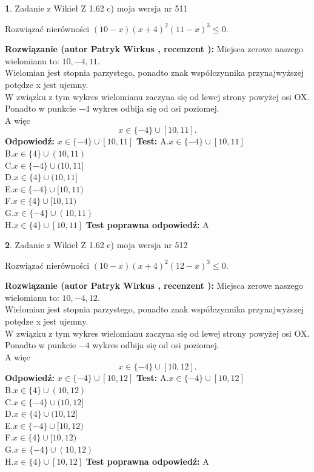 \documentclass[12pt, a4paper]{article}
\theoremstyle{definition} %
\newtheorem{zad}{}
\newcommand{\zadStart}[1]{\begin{zad}#1\newline}
\newcommand{\zadStop}{\end{zad}}
\newcommand{\rozwStart}[2]{\noindent \textbf{Rozwiązanie (autor #1 , recenzent #2): }\newline}
\newcommand{\rozwStop}{\newline}
\newcommand{\odpStart}{\noindent \textbf{Odpowiedź:}\newline}
\newcommand{\odpStop}{\newline}
\newcommand{\testStart}{\noindent \textbf{Test:}\newline}
\newcommand{\testStop}{\newline}
\newcommand{\kluczStart}{\noindent \textbf{Test poprawna odpowiedź:}\newline}
\newcommand{\kluczStop}{\newline}
\begin{document}
\zadStart{Zadanie z Wikieł Z 1.62 c) moja wersja nr 511}

Rozwiązać nierówności $(10-x)(x+4)^{2}(11-x)^{3}\le0$.
\zadStop
\rozwStart{Patryk Wirkus}{}
Miejsca zerowe naszego wielomianu to: $10, -4, 11$.\\
Wielomian jest stopnia parzystego, ponadto znak współczynnika przy\linebreak najwyższej potędze x jest ujemny.\\ W związku z tym wykres wielomianu zaczyna się od lewej strony powyżej osi OX.\\
Ponadto w punkcie $-4$ wykres odbija się od osi poziomej.\\
A więc $$x \in \{-4\} \cup [10,11].$$
\rozwStop
\odpStart
$x \in \{-4\} \cup [10,11]$
\odpStop
\testStart
A.$x \in \{-4\} \cup [10,11]$\\
B.$x \in \{4\} \cup (10,11)$\\
C.$x \in \{-4\} \cup (10,11]$\\
D.$x \in \{4\} \cup (10,11]$\\
E.$x \in \{-4\} \cup [10,11)$\\
F.$x \in \{4\} \cup [10,11)$\\
G.$x \in \{-4\} \cup (10,11)$\\
H.$x \in \{4\} \cup [10,11]$
\testStop
\kluczStart
A
\kluczStop



\zadStart{Zadanie z Wikieł Z 1.62 c) moja wersja nr 512}

Rozwiązać nierówności $(10-x)(x+4)^{2}(12-x)^{3}\le0$.
\zadStop
\rozwStart{Patryk Wirkus}{}
Miejsca zerowe naszego wielomianu to: $10, -4, 12$.\\
Wielomian jest stopnia parzystego, ponadto znak współczynnika przy\linebreak najwyższej potędze x jest ujemny.\\ W związku z tym wykres wielomianu zaczyna się od lewej strony powyżej osi OX.\\
Ponadto w punkcie $-4$ wykres odbija się od osi poziomej.\\
A więc $$x \in \{-4\} \cup [10,12].$$
\rozwStop
\odpStart
$x \in \{-4\} \cup [10,12]$
\odpStop
\testStart
A.$x \in \{-4\} \cup [10,12]$\\
B.$x \in \{4\} \cup (10,12)$\\
C.$x \in \{-4\} \cup (10,12]$\\
D.$x \in \{4\} \cup (10,12]$\\
E.$x \in \{-4\} \cup [10,12)$\\
F.$x \in \{4\} \cup [10,12)$\\
G.$x \in \{-4\} \cup (10,12)$\\
H.$x \in \{4\} \cup [10,12]$
\testStop
\kluczStart
A
\kluczStop
\end{document}
